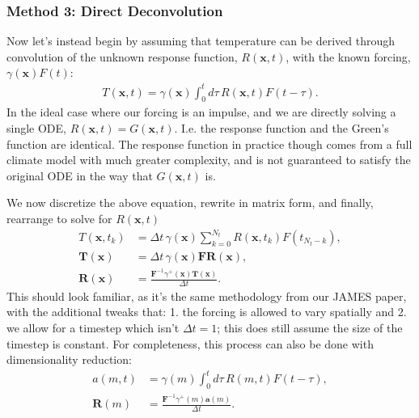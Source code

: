 \subsubsection{Method 3: Direct Deconvolution}

Now let's instead begin by assuming that temperature can be derived through convolution of the unknown response function, $R(\mathbf{x}, t)$, with the known forcing, $\gamma(\mathbf{x}) F(t)$:
\begin{align}
  T(\mathbf{x},t) = \gamma(\mathbf{x}) \int_0^t d\tau \, R(\mathbf{x},t) F(t - \tau).
\end{align}
In the ideal case where our forcing is an impulse, and we are directly solving a single ODE, $R(\mathbf{x},t) = G(\mathbf{x},t)$. I.e. the response function and the Green's function are identical. The response function in practice though comes from a full climate model with much greater complexity, and is not guaranteed to satisfy the original ODE in the way that $G(\mathbf{x},t)$ is.

We now discretize the above equation, rewrite in matrix form, and finally, rearrange to solve for $R(\mathbf{x},t)$
\begin{align}
  T(\mathbf{x},t_k) &= \Delta t \, \gamma(\mathbf{x}) \sum_{k = 0}^{N_t} R(\mathbf{x},t_k) F(t_{N_t - k}),\\
  \mathbf{T}(\mathbf{x}) &= \Delta t \, \gamma(\mathbf{x}) \mathbf{F} \mathbf{R}(\mathbf{x}),\\
  \mathbf{R}(\mathbf{x}) &= \frac{\mathbf{F}^{-1} \gamma^+(\mathbf{x}) \mathbf{T}(\mathbf{x})}{\Delta t}.
\end{align}
This should look familiar, as it's the same methodology from our JAMES paper, with the additional tweaks that: 1. the forcing is allowed to vary spatially and 2. we allow for a timestep which isn't $\Delta t = 1$; this does still assume the size of the timestep is constant. For completeness, this process can also be done with dimensionality reduction:
\begin{align}
  a(m,t) &= \gamma(m) \int_0^t d\tau \, R(m,t) F(t - \tau),\\
  \mathbf{R}(m) &= \frac{\mathbf{F}^{-1} \gamma^+(m) \mathbf{a}(m)}{\Delta t}.
\end{align}

